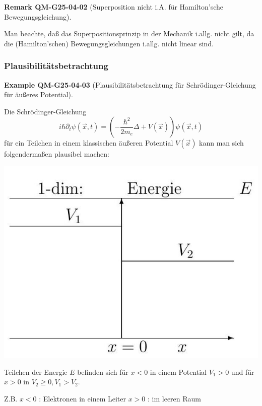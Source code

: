 \documentclass[10pt, letterpaper]{article}
\newcommand{\CustomHeading}[3]{%
  \par\medskip\noindent%
  \textbf{#1 #2} \textnormal{(#3)}.\enskip%
}
\newenvironment{REM}[2]{\begin{unitbox}\CustomHeading{Remark}{#1}{#2}}{\end{unitbox}}
\newenvironment{EXA}[2]{\begin{unitbox}\CustomHeading{Example}{#1}{#2}}{\end{unitbox}}
\begin{document}
\begin{REM}{QM-G25-04-02}{Superposition nicht i.A. für Hamilton'sche Bewegungsgleichung}
Man beachte, daß das Superpositionsprinzip in der Mechanik i.allg. nicht gilt, da die (Hamilton'schen) Bewegungsgleichungen i.allg. nicht linear sind.
\end{REM}



\subsubsection*{Plausibilitätsbetrachtung}


\begin{EXA}{QM-G25-04-03}{Plausibilitätsbetrachtung für Schrödinger-Gleichung für äußeres Potential}
Die Schrödinger-Gleichung
$$
i \hbar \partial_{t} \psi(\vec{x}, t)=\left(-\frac{\hbar^{2}}{2 m_{e}} \Delta+V(\vec{x})\right) \psi(\vec{x}, t)
$$
für ein Teilchen in einem klassischen äußeren Potential $V(\vec{x})$ kann man sich folgendermaßen plausibel machen:

\includegraphics[scale=0.2, center]{2025_05_21_11b1754c718f6fcf84f8g-08}

Teilchen der Energie $E$ befinden sich für $x<0$ in einem Potential $V_{1}>0$ und für $x>0$ in $V_{2} \geq 0, V_{1}>V_{2}$.

Z.B. $x<0$ : Elektronen in einem Leiter $x>0$ : im leeren Raum


\end{EXA}
\end{document}
